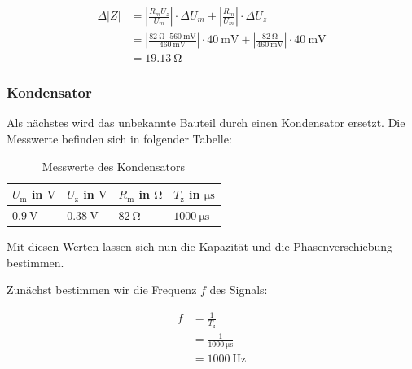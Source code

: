             \begin{equation}
                \begin{aligned}
                    \Delta |Z| &= \left|\frac{R_{m} U_{z}}{U_{m}} \right| \cdot \Delta U_{m} + \left|\frac{R_{m}}{U_{m}} \right| \cdot \Delta U_{z}\\
                               &= \left|\frac{82\ \mathrm{\Omega} \cdot 560\ \mathrm{mV}}{460\ \mathrm{mV}} \right| \cdot 40\ \mathrm{mV} + \left|\frac{82\ \mathrm{\Omega}}{460\ \mathrm{mV}} \right| \cdot 40\ \mathrm{mV}\\
                               &= 19.13\ \mathrm{\Omega}
                \end{aligned}
                \label{eq:Versuch2_Widerstand_Fehler}
            \end{equation}

        \subsubsection{Kondensator}
        \label{sec:Versuch2_Kondensator}
            
            Als nächstes wird das unbekannte Bauteil durch einen Kondensator ersetzt. Die Messwerte befinden sich in folgender Tabelle:

            \begin{table}[H]
                \centering
                \caption{Messwerte des Kondensators}
                \vspace{1em}
                \begin{tabular}{|l|l|l|l|}
                    \hline
                    $U_{\mathrm{m}}$ in $\mathrm{V}$ & $U_{\mathrm{z}}$ in $\mathrm{V}$ & $R_{\mathrm{m}}$ in $\mathrm{\Omega}$ & $T_{\mathrm{z}}$ in $\mathrm{\mu s}$\\
                    \hline
                    \hline
                    $0.9\ \mathrm{V}$ & $0.38\ \mathrm{V}$ & $82\ \mathrm{\Omega}$ & $1000\ \mathrm{\mu s}$\\
                    \hline
                \end{tabular}
                \label{tab:Versuch2_Kondensator}
            \end{table}

            Mit diesen Werten lassen sich nun die Kapazität und die Phasenverschiebung bestimmen.
            
            Zunächst bestimmen wir die Frequenz $f$ des Signals:

            \begin{equation}
                \begin{aligned}
                    f &= \frac{1}{T_{\mathrm{z}}}\\
                      &= \frac{1}{1000\ \mathrm{\mu s}}\\
                      &= 1000\ \mathrm{Hz}
                \end{aligned}
                \label{eq:Versuch2_Kondensator_Frequenz}
            \end{equation}

